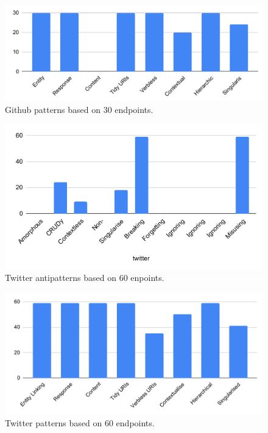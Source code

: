 \documentclass[a4paper,12pt]{article}
\begin{document}
\begin{figure}[!h]
\begin{center}
\includegraphics[keepaspectratio,scale=0.8]{Template_report_LaTeX_EN/img/barchart/githubBarPatt.pdf}
\caption{Github patterns based on 30 endpoints.}
\label{fig:githubBarPattEx}
\end{center}
\end{figure}

\begin{figure}[!h]
\begin{center}
\includegraphics[keepaspectratio,scale=0.8]{Template_report_LaTeX_EN/img/barchart/twitterBarAnti.pdf}
\caption{Twitter antipatterns based on 60 enpoints.}
\label{fig:twitterBarAntiEx}
\end{center}
\end{figure}

\begin{figure}[!h]
\begin{center}
\includegraphics[keepaspectratio,scale=0.8]{Template_report_LaTeX_EN/img/barchart/twitterBarPatt.pdf}
\caption{Twitter patterns based on 60 endpoints.}
\label{fig:twitterBarPattEx}
\end{center}
\end{figure}
\end{document}
